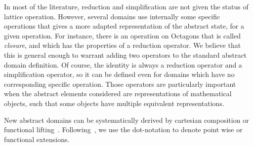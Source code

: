 \documentclass[sttt]{svjour}
\begin{document}
In most of the literature, reduction and simplification are not given the status of lattice operation. However, several domains use internally some specific operations that gives a more adapted representation of the abstract state, for a given operation.
For instance, there is an operation on Octagons that is called \emph{closure}, and which has the properties of a reduction operator.
We believe that this is general enough to warrant adding two operators to the standard abstract domain definition.
Of course, the identity is always a reduction operator and a simplification operator, so it can be defined even for domains which have no corresponding specific operation.
Those operators are particularly important when the abstract elements considered are representations of mathematical objects, such that some objects have multiple equivalent representations.

New abstract domains can be systematically derived by cartesian composition or functional lifting~\cite{CousotCousot79}. 
Following~\cite{Cousot98}, we use the dot-notation to denote point wise or functional extensions.
\end{document}
